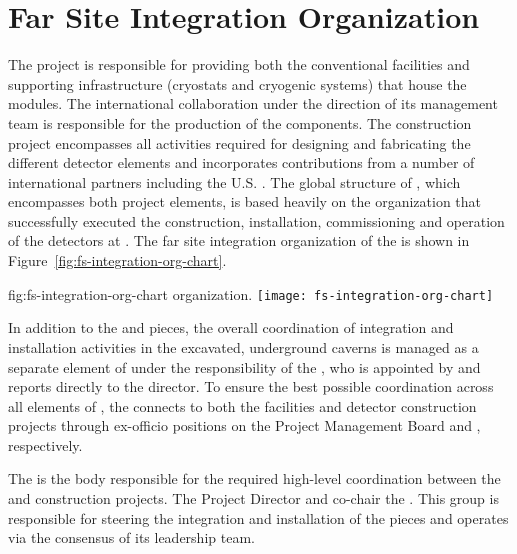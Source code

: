 \section{Far Site Integration Organization}
\label{sec:exec-tc-partners}

The  project is responsible for providing both the 
conventional facilities and supporting infrastructure (cryostats 
and cryogenic systems) that house the   
modules.  
The international  
collaboration under the direction of its management team is 
responsible for the production of the  components.  The 
  construction project encompasses all 
activities required for designing and fabricating the different 
detector elements and incorporates contributions from a number 
of international partners including the U.S. .  
The global structure of , which encompasses 
both project elements, is based heavily on 
the organization that successfully executed the construction,
installation, commissioning and operation of the 
detectors at . 
The 
far site integration organization of the  is shown in Figure~\ref{fig:fs-integration-org-chart}. 

\begin{dunefigure}{fig:fs-integration-org-chart}
  { organization.}
  \texttt{[image: fs-integration-org-chart]} %
\end{dunefigure}

In addition to the  and  pieces, the 
overall coordination of integration and installation activities 
in the excavated, underground caverns is managed as a separate
element of  under the responsibility of 
the , who is appointed by and reports directly to the 
 director.  To ensure the best possible coordination 
across all elements of , the  connects 
to both the facilities and detector construction projects through 
ex-officio positions on the  Project Management Board 
and  , respectively.

The  is the body responsible for the required high-level
coordination between the  and  construction 
projects.  The  Project Director and  
co-chair the .  This group is responsible for steering the integration and 
installation of the  pieces and operates via the 
consensus of its leadership team. 

